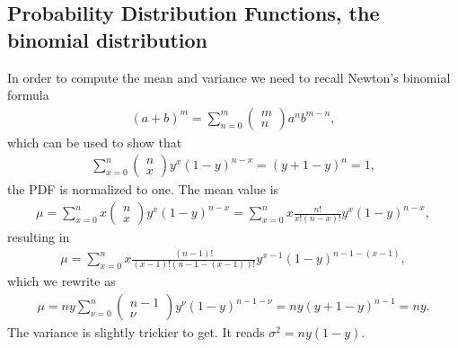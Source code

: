 \documentclass[letterpaper,10pt,english]{sphinxmanual}
\begin{document}
\subsection{Probability Distribution Functions, the binomial distribution}
\label{\detokenize{chapter3:probability-distribution-functions-the-binomial-distribution}}
In order to compute the mean and variance we need to recall Newton’s binomial
formula
\begin{equation*}
\begin{split}
(a+b)^m=\sum_{n=0}^m \left(\begin{array}{c} m \\ n\end{array}\right)a^nb^{m-n},
\end{split}
\end{equation*}
which can be used to show that
\begin{equation*}
\begin{split}
\sum_{x=0}^n\left(\begin{array}{c} n \\ x\end{array}\right)y^x(1-y)^{n-x} = (y+1-y)^n = 1,
\end{split}
\end{equation*}
the PDF is normalized to one.
The mean value is
\begin{equation*}
\begin{split}
\mu = \sum_{x=0}^n x\left(\begin{array}{c} n \\ x\end{array}\right)y^x(1-y)^{n-x} =
\sum_{x=0}^n x\frac{n!}{x!(n-x)!}y^x(1-y)^{n-x},
\end{split}
\end{equation*}
resulting in
\begin{equation*}
\begin{split}
\mu = 
\sum_{x=0}^n x\frac{(n-1)!}{(x-1)!(n-1-(x-1))!}y^{x-1}(1-y)^{n-1-(x-1)},
\end{split}
\end{equation*}
which we rewrite as
\begin{equation*}
\begin{split}
\mu=ny\sum_{\nu=0}^n\left(\begin{array}{c} n-1 \\ \nu\end{array}\right)y^{\nu}(1-y)^{n-1-\nu} =ny(y+1-y)^{n-1}=ny.
\end{split}
\end{equation*}
The variance is slightly trickier to get. It reads \(\sigma^2=ny(1-y)\).
\end{document}
